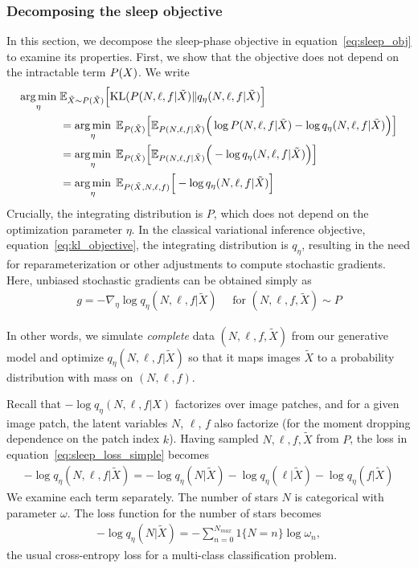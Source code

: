 \subsubsection{Decomposing the sleep objective}
\label{sec:sleep_details}
In this section, we decompose the sleep-phase objective in equation~\ref{eq:sleep_obj} to examine its properties. First, we show 
that the objective does not depend on the intractable term $P(X)$. 
We write
\begin{align}
 \operatorname*{arg\,min}_{\eta} \; & \mathbb{E}_{\tilde X \sim P(\tilde X)}\Big[ \mathrm{KL}(P(N, \ell, f | \tilde X) \| q_\eta(N, \ell, f | \tilde X)\Big] \\
  &=\operatorname*{arg\,min}_{\eta} \; \mathbb E_{P(\tilde X)}\Big[\mathbb E_{P(N, \ell, f | \tilde X)}\Big(\log P(N, \ell, f | \tilde X) - \log q_\eta(N, \ell, f | \tilde X) \Big)\Big]\\
&=\operatorname*{arg\,min}_{\eta} \; \mathbb E_{P(\tilde X)}\Big[\mathbb E_{P(N, \ell, f | \tilde X)}\Big( - \log q_\eta(N, \ell, f | \tilde X) \Big)\Big]\\
&=\operatorname*{arg\,min}_{\eta} \; \mathbb E_{P(\tilde X, N, \ell, f)}\Big[- \log q_\eta(N, \ell, f | \tilde X) \Big]\label{eq:sleep_loss_simple}
\end{align}
Crucially, the integrating distribution is $P$, which does not depend on the optimization parameter $\eta$.
In the classical variational inference objective, equation~\eqref{eq:kl_objective},
the integrating distribution is $q_\eta$, resulting in the need for reparameterization or other adjustments to compute stochastic gradients. 
Here, unbiased stochastic gradients can be obtained simply as 
\begin{align}
    g = -\nabla_\eta \log q_\eta(N, \ell, f | \tilde X) \quad \text{ for } (N, \ell, f, \tilde X)\sim P
\end{align}

In other words, we simulate {\itshape complete} data $(N, \ell, f, \tilde X)$ from our generative model and optimize $q_{\eta}(N, \ell, f | \tilde X)$ so that it maps images $\tilde X$ to a probability distribution with mass on $(N, \ell, f)$.

Recall that $-\log q_\eta(N, \ell, f | X)$ factorizes over image patches, and 
for a given image patch, the latent variables $N$, $\ell$, $f$ also factorize (for the moment dropping dependence on the patch index $k$). Having sampled $N,\ell,f,\tilde X$ from $P$, the loss in equation~\eqref{eq:sleep_loss_simple} becomes
\begin{align}
    - \log q_\eta(N, \ell, f | \tilde X) = 
        - \log q_\eta(N | \tilde X) 
        - \log q_\eta(\ell | \tilde X) 
        - \log q_\eta(f | \tilde X) 
        \label{eq:sleep_loss_decomp}
\end{align}
We examine each term separately. The number of stars $N$ is categorical with parameter $\omega$. The loss function for the number of stars becomes
\begin{align}
    - \log q_\eta(N | \tilde X) = -\sum_{n = 0}^{N_{max}} 1\{N = n\} \log \omega_n, 
\end{align}
the usual cross-entropy loss for a multi-class classification problem. 

